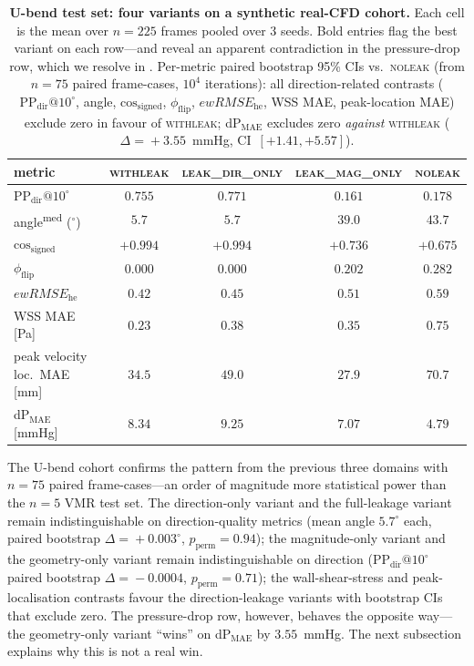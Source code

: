 \documentclass[10pt,a4paper]{article}
\makeatletter
\newcommand{\withleak}{\textsc{withleak}}
\newcommand{\dironly}{\textsc{leak\_dir\_only}}
\newcommand{\magonly}{\textsc{leak\_mag\_only}}
\newcommand{\noleak}{\textsc{noleak}}
\newcommand{\PPdir}[1]{\mathrm{PP_{dir}}@#1^\circ}
\newcommand{\cosgn}{\mathrm{cos}_\mathrm{signed}}
\newcommand{\fracflip}{\phi_\mathrm{flip}}
\newcommand{\ewRMSE}{ewRMSE_{\text{he}}}
\makeatother
\begin{document}
\begin{table}[h]
\centering
\small
\begin{tabular}{lcccc}
\toprule
metric & \withleak{} & \dironly{} & \magonly{} & \noleak{} \\
\midrule
$\PPdir{10}$              & $0.755$ & $0.771$ & $0.161$ & $0.178$ \\
angle\textsuperscript{med} ($^\circ$) & $5.7$  & $5.7$  & $39.0$ & $43.7$ \\
$\cosgn$                  & $+0.994$ & $+0.994$ & $+0.736$ & $+0.675$ \\
$\fracflip$               & $0.000$ & $0.000$ & $0.202$ & $0.282$ \\
$\ewRMSE$                 & $0.42$ & $0.45$ & $0.51$ & $0.59$ \\
WSS MAE [Pa]              & $\mathbf{0.23}$ & $0.38$ & $0.35$ & $0.75$ \\
peak velocity loc.\ MAE [mm] & $\mathbf{34.5}$ & $49.0$ & $27.9$ & $70.7$ \\
dP$_\mathrm{MAE}$ [mmHg]  & $8.34$ & $9.25$ & $7.07$ & $\mathbf{4.79}$ \\
\bottomrule
\end{tabular}
\caption{\textbf{U-bend test set: four variants on a synthetic
real-CFD cohort.} Each cell is the mean over $n=225$ frames pooled
over $3$ seeds. Bold entries flag the best variant on each
row---and reveal an apparent contradiction in the pressure-drop row,
which we resolve in . Per-metric paired
bootstrap 95\% CIs vs.\ \noleak{} (from $n\!=\!75$ paired frame-cases,
$10^4$ iterations): all direction-related contrasts
($\PPdir{10}$, angle, $\cosgn$, $\fracflip$, $\ewRMSE$, WSS MAE,
peak-location MAE) exclude zero in favour of \withleak{}; dP$_\mathrm{MAE}$
excludes zero \emph{against} \withleak{} ($\Delta\!=\!+3.55$~mmHg,
CI~$[+1.41,+5.57]$).}
\label{tab:subend_clinical}
\end{table}

The U-bend cohort confirms the pattern from the previous three
domains with $n\!=\!75$ paired frame-cases---an order of magnitude
more statistical power than the $n\!=\!5$ VMR test set. The
direction-only variant and the full-leakage variant remain
indistinguishable on direction-quality metrics (mean angle
$5.7^\circ$ each, paired bootstrap $\Delta\!=\!+0.003^\circ$,
$p_\mathrm{perm}\!=\!0.94$); the magnitude-only variant and the
geometry-only variant remain indistinguishable on direction
($\PPdir{10}$ paired bootstrap $\Delta\!=\!-0.0004$,
$p_\mathrm{perm}\!=\!0.71$); the wall-shear-stress and
peak-localisation contrasts favour the direction-leakage variants
with bootstrap CIs that exclude zero. The pressure-drop row,
however, behaves the opposite way---the geometry-only variant
``wins'' on dP$_\mathrm{MAE}$ by $3.55$~mmHg. The next subsection
explains why this is not a real win.
\end{document}
